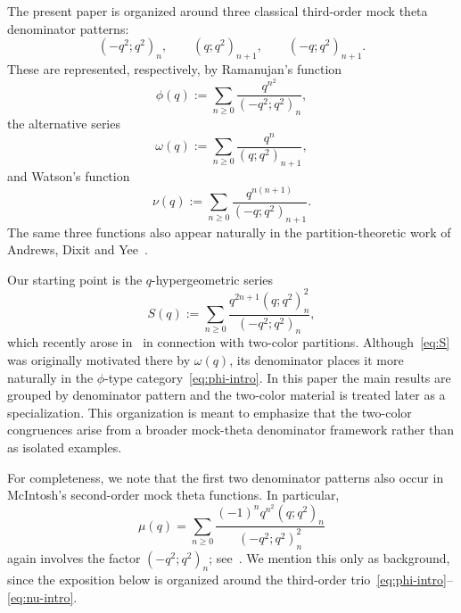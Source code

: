 \documentclass[reqno]{amsart}
\theoremstyle{definition}
\theoremstyle{plain}
\theoremstyle{remark}
\numberwithin{equation}{section}
\begin{document}
The present paper is organized around three classical third-order mock theta denominator patterns:
\[
(-q^2;q^2)_n,
\qquad
(q;q^2)_{n+1},
\qquad
(-q;q^2)_{n+1}.
\]
These are represented, respectively, by Ramanujan's function
\begin{equation}\label{eq:phi-intro}
\phi(q):=\sum_{n\ge 0}\frac{q^{n^2}}{(-q^2;q^2)_n},
\end{equation}
the alternative series
\begin{equation}\label{eq:omega-intro}
\omega(q):=\sum_{n\ge 0}\frac{q^n}{(q;q^2)_{n+1}},
\end{equation}
and Watson's function
\begin{equation}\label{eq:nu-intro}
\nu(q):=\sum_{n\ge 0}\frac{q^{n(n+1)}}{(-q;q^2)_{n+1}}.
\end{equation}
The same three functions also appear naturally in the partition-theoretic work of Andrews, Dixit and Yee~\cite{andrews-dixit-yee}.

Our starting point is the $q$-hypergeometric series
\begin{equation}\label{eq:S}
S(q):=\sum_{n\ge 0}\frac{q^{2n+1}(q;q^2)_n^2}{(-q^2;q^2)_n},
\end{equation}
which recently arose in~\cite{andrews-elbachraoui, banerjee-etal} in connection with two-color partitions. Although~\eqref{eq:S} was originally motivated there by $\omega(q)$, its denominator places it more naturally in the $\phi$-type category~\eqref{eq:phi-intro}.
In this paper the main results are grouped by denominator pattern and the two-color material is treated later as a specialization. This organization is meant to emphasize that the two-color congruences arise from a broader mock-theta denominator framework rather than as isolated examples.

For completeness, we note that the first two denominator patterns also occur in McIntosh's second-order mock theta functions. In particular,
\begin{equation}\label{eq:ABmu-short}
\mu(q)=\sum_{n\ge 0}\frac{(-1)^n q^{n^2}(q;q^2)_n}{(-q^2;q^2)_n^2}
\end{equation}
again involves the factor $(-q^2;q^2)_n$; see~\cite{mcintosh-second-order}. We mention this only as background, since the exposition below is organized around the third-order trio~\eqref{eq:phi-intro}--\eqref{eq:nu-intro}.
\end{document}
